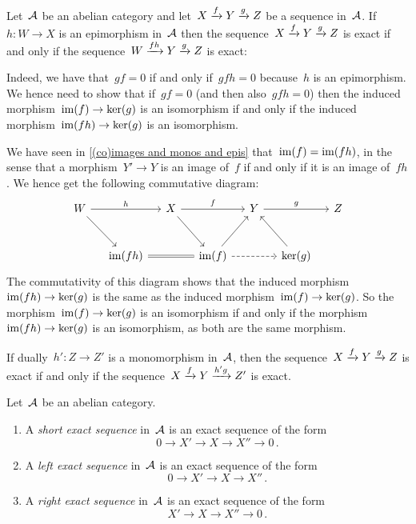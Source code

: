 \begin{remark*}
  \label{composing exact sequence with epi and mono}
  Let~$\mathcal{A}$ be an abelian category and let~$X \xrightarrow{f} Y \xrightarrow{g} Z$ be a sequence in~$\mathcal{A}$.
  If~$h \colon W \to X$ is an epimorphism in~$\mathcal{A}$ then the sequence~$X \xrightarrow{f} Y \xrightarrow{g} Z$ is exact if and only if the sequence~$W \xrightarrow{fh} Y \xrightarrow{g} Z$ is exact:
  
  Indeed, we have that~$gf = 0$ if and only if~$gfh = 0$ because~$h$ is an epimorphism.
  We hence need to show that if~$gf = 0$ (and then also~$gfh = 0$) then the induced morphism~$\operatorname{im}(f) \to \ker(g)$ is an isomorphism if and only if the induced morphism~$\operatorname{im}(fh) \to \ker(g)$ is an isomorphism.
  
  We have seen in \cref{(co)images and monos and epis} that~$\operatorname{im}(f) = \operatorname{im}(fh)$, in the sense that a morphism~$Y' \to Y$ is an image of~$f$ if and only if it is an image of~$fh$.
  We hence get the following commutative diagram:
  \[
    \begin{tikzcd}[column sep = small, row sep = large]
        W
        \arrow{rr}[above]{h}
        \arrow{dr}
      & {}
      & X
        \arrow{rr}[above]{f}
        \arrow{dr}
      & {}
      & Y
        \arrow{rr}[above]{g}
      & {}
      & Z
      \\
      & \im(fh)
        \arrow[equal]{rr}
      & {}
      & \im(f)
        \arrow{ur}
        \arrow[dashed]{rr}
      & {}
      & \ker(g)
        \arrow{ul}
      & {}
    \end{tikzcd}
  \]
  The commutativity of this diagram shows that the induced morphism~$\operatorname{im}(fh) \to \ker(g)$ is the same as the induced morphism~$\operatorname{im}(f) \to \ker(g)$.
  So the morphism~$\operatorname{im}(f) \to \ker(g)$ is an isomorphism if and only if the morphism~$\operatorname{im}(fh) \to \ker(g)$ is an isomorphism, as both are the same morphism.
  
  If dually~$h' \colon Z \to Z'$ is a monomorphism in~$\mathcal{A}$, then the sequence~$X \xrightarrow{f} Y \xrightarrow{g} Z$ is exact if and only if the sequence~$X \xrightarrow{f} Y \xrightarrow{h' g} Z'$ is exact.
\end{remark*}


\begin{definition*}
  Let~$\mathcal{A}$ be an abelian category.
  \begin{enumerate}
    \item
      A \emph{short exact sequence} in~$\mathcal{A}$ is an exact sequence of the form
      \[
            0
        \to X'
        \to X
        \to X''
        \to 0 \,.
      \]
    \item
      A \emph{left exact sequence} in~$\mathcal{A}$ is an exact sequence of the form
      \[
            0
        \to X'
        \to X
        \to X'' \,.
      \]
    \item
      A \emph{right exact sequence} in~$\mathcal{A}$ is an exact sequence of the form
      \[
            X'
        \to X
        \to X''
        \to 0 \,.
      \]
  \end{enumerate}
\end{definition*}


